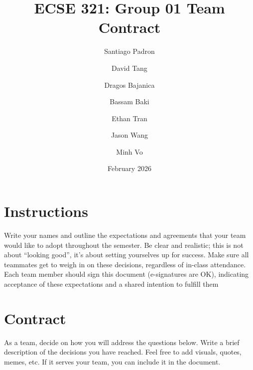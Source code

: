 \documentclass[11pt]{article}
\title{ECSE 321: Group 01 Team Contract}
\author{Santiago Padron \and David Tang \and Dragos Bajanica \and Bassam Baki \and Ethan Tran \and Jason Wang \and Minh Vo}
\date{February 2026}
\begin{document}
\maketitle

\section*{Instructions}
Write your names and outline the expectations and agreements that your team would like to adopt throughout the semester. Be clear and realistic; this is not about “looking good”, it’s about setting yourselves up for success. Make sure all teammates get to weigh in on these decisions, regardless of in-class attendance. Each team member should sign this document (e-signatures are OK), indicating acceptance of these expectations and a shared intention to fulfill them

\section*{Contract}
As a team, decide on how you will address the questions below. Write a brief description of the decisions you have reached. Feel free to add visuals, quotes, memes, etc. If it serves your team, you can include it in the document.
\end{document}
